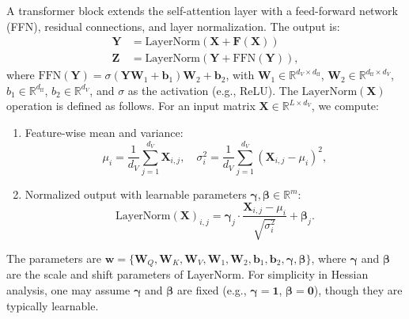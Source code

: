 \documentclass{article}
\begin{document}
A transformer block extends the self-attention layer with a feed-forward network (FFN), residual connections, and layer normalization. The output is:
\begin{align} 
\mathbf{Y} &= \text{LayerNorm}(\mathbf{X} + \mathbf{F}(\mathbf{X})) \\ 
\mathbf{Z} &= \text{LayerNorm}(\mathbf{Y} + \text{FFN}(\mathbf{Y})), \label{eq:transformer}
\end{align} 
where \( \text{FFN}(\mathbf{Y}) = \sigma(\mathbf{Y} \mathbf{W}_1 + \mathbf{b}_1) \mathbf{W}_2 + \mathbf{b}_2 \), with \( \mathbf{W}_1 \in \mathbb{R}^{d_V \times d_{\text{ff}}} \), \( \mathbf{W}_2 \in \mathbb{R}^{d_{\text{ff}} \times d_V} \), \( b_1 \in \mathbb{R}^{d_{\text{ff}}} \), \( b_2 \in \mathbb{R}^{d_V} \), and \( \sigma \) as the activation (e.g., ReLU). The $\text{LayerNorm}(\mathbf{X})$ operation is defined as follows. For an input matrix \(\mathbf{X} \in \mathbb{R}^{L \times d_V}\), we compute:
\begin{enumerate}
    \item Feature-wise mean and variance:
    \[
    \mu_i = \frac{1}{d_V} \sum_{j=1}^{d_V} \mathbf{X}_{i,j}, \quad \sigma_i^2 = \frac{1}{d_V} \sum_{j=1}^{d_V} (\mathbf{X}_{i,j} - \mu_i)^2,
    \]
    
    \item Normalized output with learnable parameters \(\mathbf{\gamma}, \mathbf{\beta} \in \mathbb{R}^m\):
    \[
    \text{LayerNorm}(\mathbf{X})_{i,j} = \mathbf{\gamma}_j \cdot \frac{\mathbf{X}_{i,j} - \mu_i}{\sqrt{\sigma_i^2}} + \mathbf{\beta}_j.
    \]
\end{enumerate}



The parameters are \( \mathbf{w} = \{\mathbf{W}_Q, \mathbf{W}_K, \mathbf{W}_V, \mathbf{W}_1, \mathbf{W}_2, \mathbf{b}_1, \mathbf{b}_2, \mathbf{\gamma}, \mathbf{\beta}\} \), where \(\mathbf{\gamma}\) and \(\mathbf{\beta}\) are the scale and shift parameters of LayerNorm. For simplicity in Hessian analysis, one may assume \(\mathbf{\gamma}\) and \(\mathbf{\beta}\) are fixed (e.g., \(\mathbf{\gamma} = \mathbf{1}\), \(\mathbf{\beta} = \mathbf{0}\)), though they are typically learnable. 
\end{document}
